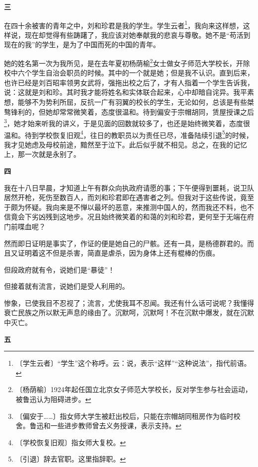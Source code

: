 \documentclass[12pt,UTF-8,openany]{ctexbook}
\begin{document}
\begin{large}
    \begin{center}\textbf{三}\end{center}
    
    在四十余被害的青年之中，刘和珍君是我的学生。学生云者\footnote{〔学生云者〕“学生”这个称呼。云：说，表示“这样”“这种说法”，指代前语。}，我向来这样想，这样说，现在却觉得有些踌躇了，我应该对她奉献我的悲哀与尊敬。她不是“苟活到现在的我”的学生，是为了中国而死的中国的青年。
    
    她的姓名第一次为我所见，是在去年夏初杨荫榆\footnote{〔杨荫榆〕1924年起任国立北京女子师范大学校长，反对学生参与社会运动，被鲁迅认为阻碍进步。}女士做女子师范大学校长，开除校中六个学生自治会职员的时候。其中的一个就是她；但是我不认识。直到后来，也许已经是刘百昭率领男女武将，强拖出校之后了，才有人指着一个学生告诉我，说：这就是刘和珍。其时我才能将姓名和实体联合起来，心中却暗自诧异。我平素想，能够不为势利所屈，反抗一广有羽翼的校长的学生，无论如何，总该是有些桀骜锋利的，但她却常常微笑着，态度很温和。待到偏安于宗帽胡同，赁屋授课之后\footnote{〔偏安于……〕指女师大学生被赶出校后，只能在宗帽胡同租房作为临时校舍。鲁迅和一些进步教师曾去义务授课，表示支持。}，她才始来听我的讲义，于是见面的回数就较多了，也还是始终微笑着，态度很温和。待到学校恢复旧观\footnote{〔学校恢复旧观〕指女师大复校。}，往日的教职员以为责任已尽，准备陆续引退\footnote{〔引退〕辞去官职。这里指辞职。}的时候，我才见她虑及母校前途，黯然至于泣下。此后似乎就不相见。总之，在我的记忆上，那一次就是永别了。
    
    \begin{center}\textbf{四}\end{center}
    
    我在十八日早晨，才知道上午有群众向执政府请愿的事；下午便得到噩耗，说卫队居然开枪，死伤至数百人，而刘和珍君即在遇害者之列。但我对于这些传说，竟至于颇为怀疑。我向来是不惮以最坏的恶意，来推测中国人的，然而我还不料，也不信竟会下劣凶残到这地步。况且始终微笑着的和蔼的刘和珍君，更何至于无端在府门前喋血呢？
    
    然而即日证明是事实了，作证的便是她自己的尸骸。还有一具，是杨德群君的。而且又证明着这不但是杀害，简直是虐杀，因为身体上还有棍棒的伤痕。
    
    但段政府就有令，说她们是“暴徒”！
    
    但接着就有流言，说她们是受人利用的。
    
    惨象，已使我目不忍视了；流言，尤使我耳不忍闻。我还有什么话可说呢？我懂得衰亡民族之所以默无声息的缘由了。沉默呵，沉默呵！不在沉默中爆发，就在沉默中灭亡。
    
    \begin{center}\textbf{五}\end{center}
    

\end{large}
\end{document}
